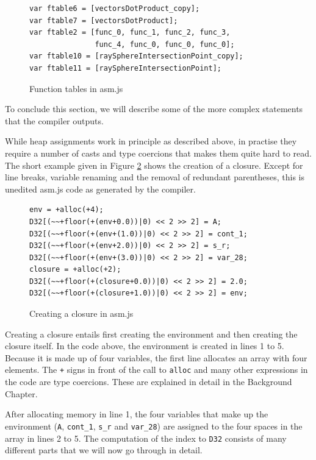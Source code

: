 \documentclass[11pt]{report}
\begin{document}
\begin{figure}[t]
\begin{lstlisting}
var ftable6 = [vectorsDotProduct_copy];
var ftable7 = [vectorsDotProduct];
var ftable2 = [func_0, func_1, func_2, func_3, 
               func_4, func_0, func_0, func_0];
var ftable10 = [raySphereIntersectionPoint_copy];
var ftable11 = [raySphereIntersectionPoint];
\end{lstlisting}
\caption{Function tables in asm.js}
\label{iasmjsmm6}
\end{figure}

To conclude this section, we will describe some of the more complex statements that the compiler outputs.

While heap assignments work in principle as described above, in practise they require a number of casts and type coercions that makes them quite hard to read. The short example given in Figure \ref{iasmjsmm7} shows the creation of a closure. Except for line breaks, variable renaming and the removal of redundant parentheses, this is unedited asm.js code as generated by the compiler.

\begin{figure}[ht]
\begin{lstlisting}
env = +alloc(+4);
D32[(~~+floor(+(env+0.0))|0) << 2 >> 2] = A;
D32[(~~+floor(+(env+(1.0))|0) << 2 >> 2] = cont_1;
D32[(~~+floor(+(env+2.0))|0) << 2 >> 2] = s_r;
D32[(~~+floor(+(env+(3.0))|0) << 2 >> 2] = var_28;
closure = +alloc(+2);
D32[(~~+floor(+(closure+0.0))|0) << 2 >> 2] = 2.0;
D32[(~~+floor(+(closure+1.0))|0) << 2 >> 2] = env;
\end{lstlisting}
\caption{Creating a closure in asm.js}
\label{iasmjsmm7}
\end{figure}

Creating a closure entails first creating the environment and then creating the closure itself. In the code above, the environment is created in lines 1 to 5. Because it is made up of four variables, the first line allocates an array with four elements. The \texttt{+} signs in front of the call to \texttt{alloc} and many other expressions in the code are type coercions. These are explained in detail in the Background Chapter.

After allocating memory in line 1, the four variables that make up the environment (\texttt{A}, \texttt{cont_1}, \texttt{s_r} and \texttt{var_28}) are assigned to the four spaces in the array in lines 2 to 5. The computation of the index to \texttt{D32} consists of many different parts that we will now go through in detail.
\end{document}
